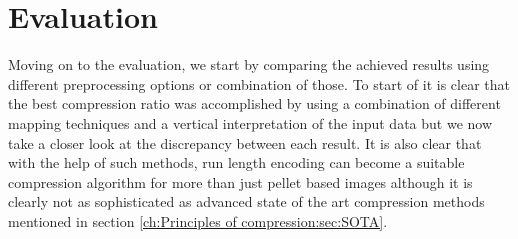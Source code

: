 
\chapter{Evaluation}
\label{ch:Evaluation}
Moving on to the evaluation, we start by comparing the achieved results using different preprocessing options or combination of those. To start of it is clear that the best compression ratio was accomplished by using a combination of different mapping techniques and a vertical interpretation of the input data but we now take a closer look at the discrepancy between each result. It is also clear that with the help of such methods, run length encoding can become a suitable compression algorithm for more than just pellet based images although it is clearly not as sophisticated as advanced state of the art compression methods mentioned in section \ref{ch:Principles of compression:sec:SOTA}.


